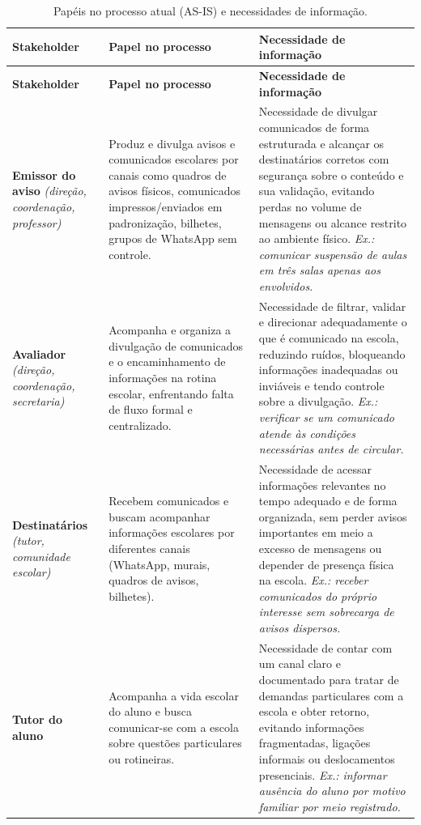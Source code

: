 \documentclass[a4paper,12pt]{report}
\begin{document}
\begin{longtable}{|p{3.2cm}|p{5.2cm}|p{6.2cm}|}
\caption{Papéis no processo atual (AS-IS) e necessidades de informação.} \label{tab:stakeholders} \\
\hline
\textbf{Stakeholder} & \textbf{Papel no processo} & \textbf{Necessidade de informação} \\
\hline
\endfirsthead
\hline
\textbf{Stakeholder} & \textbf{Papel no processo} & \textbf{Necessidade de informação} \\
\hline
\endhead
\textbf{Emissor do aviso} \newline \textit{(direção, coordenação, professor)} & Produz e divulga avisos e comunicados escolares por canais como quadros de avisos físicos, comunicados impressos/enviados em padronização, bilhetes, grupos de WhatsApp sem controle. & Necessidade de divulgar comunicados de forma estruturada e alcançar os destinatários corretos com segurança sobre o conteúdo e sua validação, evitando perdas no volume de mensagens ou alcance restrito ao ambiente físico. \textit{Ex.: comunicar suspensão de aulas em três salas apenas aos envolvidos.} \\
\hline
\textbf{Avaliador} \newline \textit{(direção, coordenação, secretaria)} & Acompanha e organiza a divulgação de comunicados e o encaminhamento de informações na rotina escolar, enfrentando falta de fluxo formal e centralizado. & Necessidade de filtrar, validar e direcionar adequadamente o que é comunicado na escola, reduzindo ruídos, bloqueando informações inadequadas ou inviáveis e tendo controle sobre a divulgação. \textit{Ex.: verificar se um comunicado atende às condições necessárias antes de circular.} \\
\hline
\textbf{Destinatários} \newline \textit{(tutor, comunidade escolar)} & Recebem comunicados e buscam acompanhar informações escolares por diferentes canais (WhatsApp, murais, quadros de avisos, bilhetes). & Necessidade de acessar informações relevantes no tempo adequado e de forma organizada, sem perder avisos importantes em meio a excesso de mensagens ou depender de presença física na escola. \textit{Ex.: receber comunicados do próprio interesse sem sobrecarga de avisos dispersos.} \\
\hline
\textbf{Tutor do aluno} & Acompanha a vida escolar do aluno e busca comunicar-se com a escola sobre questões particulares ou rotineiras. & Necessidade de contar com um canal claro e documentado para tratar de demandas particulares com a escola e obter retorno, evitando informações fragmentadas, ligações informais ou deslocamentos presenciais. \textit{Ex.: informar ausência do aluno por motivo familiar por meio registrado.} \\

\end{longtable}
\end{document}
